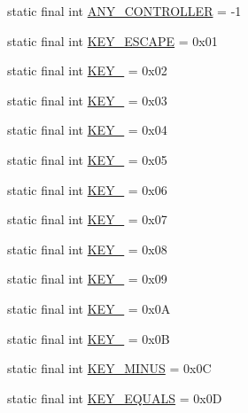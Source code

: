 \begin{DoxyCompactItemize}
\item 
static final int \mbox{\hyperlink{classorg_1_1newdawn_1_1slick_1_1_input_a1f3df3cf41eaf8ae3bdf194d5cf96dd0}{A\+N\+Y\+\_\+\+C\+O\+N\+T\+R\+O\+L\+L\+ER}} = -\/1
\item 
static final int \mbox{\hyperlink{classorg_1_1newdawn_1_1slick_1_1_input_a4b0638c1685678febcd71760564b0e37}{K\+E\+Y\+\_\+\+E\+S\+C\+A\+PE}} = 0x01
\item 
static final int \mbox{\hyperlink{classorg_1_1newdawn_1_1slick_1_1_input_a7afe7d712a0802e620de9c162df65395}{K\+E\+Y\+\_}} = 0x02
\item 
static final int \mbox{\hyperlink{classorg_1_1newdawn_1_1slick_1_1_input_a2a201e5a1b0b64bf2ec2719929bacec9}{K\+E\+Y\+\_}} = 0x03
\item 
static final int \mbox{\hyperlink{classorg_1_1newdawn_1_1slick_1_1_input_abb53a758693326fd65fa3bd4ee18842d}{K\+E\+Y\+\_}} = 0x04
\item 
static final int \mbox{\hyperlink{classorg_1_1newdawn_1_1slick_1_1_input_abb7060e59c0eabbe9c1f504107de5d08}{K\+E\+Y\+\_}} = 0x05
\item 
static final int \mbox{\hyperlink{classorg_1_1newdawn_1_1slick_1_1_input_afd9357a4104f6ef736ee5c2520865e7f}{K\+E\+Y\+\_}} = 0x06
\item 
static final int \mbox{\hyperlink{classorg_1_1newdawn_1_1slick_1_1_input_ad9f35fca9540e28e32c65fa35e78cdce}{K\+E\+Y\+\_}} = 0x07
\item 
static final int \mbox{\hyperlink{classorg_1_1newdawn_1_1slick_1_1_input_a15068107a7e84ea80eb49dbcbd92b77b}{K\+E\+Y\+\_}} = 0x08
\item 
static final int \mbox{\hyperlink{classorg_1_1newdawn_1_1slick_1_1_input_a698b282c609214c9aecebd5a6a940495}{K\+E\+Y\+\_}} = 0x09
\item 
static final int \mbox{\hyperlink{classorg_1_1newdawn_1_1slick_1_1_input_aef874f39a925bcceef41b4a7f40d42fd}{K\+E\+Y\+\_}} = 0x0A
\item 
static final int \mbox{\hyperlink{classorg_1_1newdawn_1_1slick_1_1_input_a0a08674bb180379010c63edf43882cc7}{K\+E\+Y\+\_}} = 0x0B
\item 
static final int \mbox{\hyperlink{classorg_1_1newdawn_1_1slick_1_1_input_afb1318e95a34c4fc5c08afa83669a25f}{K\+E\+Y\+\_\+\+M\+I\+N\+US}} = 0x0C
\item 
static final int \mbox{\hyperlink{classorg_1_1newdawn_1_1slick_1_1_input_a3deadf6ddd0e04ded18da42162f9ff02}{K\+E\+Y\+\_\+\+E\+Q\+U\+A\+LS}} = 0x0D

\end{DoxyCompactItemize}
